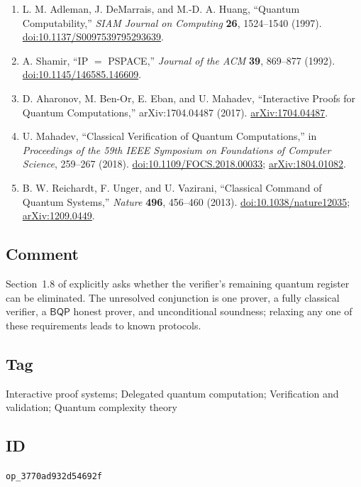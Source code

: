 \begin{enumerate}[label={},leftmargin=4.8em,labelsep=0.5em]
  \footnotesize
  \item[\textup{[ADH97]}]\label{ref:p39-adleman}
  L. M. Adleman, J. DeMarrais, and M.-D. A. Huang,
  ``Quantum Computability,'' \emph{SIAM Journal on Computing} \textbf{26},
  1524--1540 (1997).
  \href{https://doi.org/10.1137/S0097539795293639}%
       {doi:10.1137/S0097539795293639}.

  \item[\textup{[Sha92]}]\label{ref:p39-shamir}
  A. Shamir, ``IP $=$ PSPACE,'' \emph{Journal of the ACM} \textbf{39},
  869--877 (1992).
  \href{https://doi.org/10.1145/146585.146609}%
       {doi:10.1145/146585.146609}.

  \item[\textup{[ABE+17]}]\label{ref:p39-aharonov}
  D. Aharonov, M. Ben-Or, E. Eban, and U. Mahadev,
  ``Interactive Proofs for Quantum Computations,'' arXiv:1704.04487 (2017).
  \href{https://arxiv.org/abs/1704.04487}{arXiv:1704.04487}.

  \item[\textup{[Mah18]}]\label{ref:p39-mahadev}
  U. Mahadev, ``Classical Verification of Quantum Computations,'' in
  \emph{Proceedings of the 59th IEEE Symposium on Foundations of Computer
  Science}, 259--267 (2018).
  \href{https://doi.org/10.1109/FOCS.2018.00033}%
       {doi:10.1109/FOCS.2018.00033};
  \href{https://arxiv.org/abs/1804.01082}{arXiv:1804.01082}.

  \item[\textup{[RUV13]}]\label{ref:p39-reichardt}
  B. W. Reichardt, F. Unger, and U. Vazirani,
  ``Classical Command of Quantum Systems,'' \emph{Nature} \textbf{496},
  456--460 (2013).
  \href{https://doi.org/10.1038/nature12035}{doi:10.1038/nature12035};
  \href{https://arxiv.org/abs/1209.0449}{arXiv:1209.0449}.
\end{enumerate}

\subsection*{Comment}

Section~1.8 of  explicitly asks whether
the verifier's remaining quantum register can be eliminated.  The unresolved
conjunction is one prover, a fully classical verifier, a $\mathsf{BQP}$ honest
prover, and unconditional soundness; relaxing any one of these requirements
leads to known protocols.

\subsection*{Tag}

Interactive proof systems; Delegated quantum computation;
Verification and validation; Quantum complexity theory

\subsection*{ID}

\texttt{op\_3770ad932d54692f}
